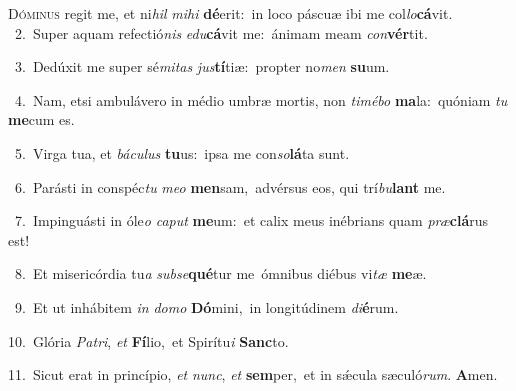 \lettrine{\initial\textcolor{\initialcolor}{D}}{óminus} regit me, et ni\textit{hil} \textit{mi}\-\textit{hi} \textbf{dé}\-erit:~\star in loco páscuæ ibi me col\-\textit{lo}\-\textbf{cá}vit.\\
{\numbfont\textcolor{\numbcolor}{~2.}}~Super aquam refectió\textit{nis} \textit{e}\-\textit{du}\textbf{cá}vit me:~\star ánimam meam \textit{con}\-\textbf{vér}tit.\par
{\numbfont\textcolor{\numbcolor}{~3.}}~Dedúxit me super sé\-\textit{mi}\-\textit{tas} \textit{jus}\-\textbf{tí}tiæ:~\star propter no\textit{men} \textbf{su}\-um.\par
{\numbfont\textcolor{\numbcolor}{~4.}}~Nam, etsi ambulávero in médio umbræ mortis, non \textit{ti}\-\textit{mé}\textit{bo} \textbf{ma}\-la:~\star quóniam \textit{tu} \textbf{me}\-cum es.\par
{\numbfont\textcolor{\numbcolor}{~5.}}~Virga tua, et \textit{bá}\-\textit{cu}\textit{lus} \textbf{tu}\-us:~\star ipsa me con\-\textit{so}\-\textbf{lá}ta sunt.\par
{\numbfont\textcolor{\numbcolor}{~6.}}~Parásti in conspéc\textit{tu} \textit{me}\-\textit{o} \textbf{men}\-sam,~\star advérsus eos, qui trí\-\textit{bu}\-\textbf{lant} me.\par
{\numbfont\textcolor{\numbcolor}{~7.}}~Impinguásti in óle\textit{o} \textit{ca}\-\textit{put} \textbf{me}\-um:~\star et calix meus inébrians quam \textit{præ}\-\textbf{clá}rus est!\par
{\numbfont\textcolor{\numbcolor}{~8.}}~Et misericórdia tu\textit{a} \textit{sub}\-\textit{se}\textbf{qué}tur me~\star ómnibus diébus vi\textit{tæ} \textbf{me}\-æ.\par
{\numbfont\textcolor{\numbcolor}{~9.}}~Et ut inhábitem \textit{in} \textit{do}\-\textit{mo} \textbf{Dó}\-mini,~\star in longitúdinem \textit{di}\-\textbf{é}rum.\par
{\numbfont\textcolor{\numbcolor}{10.}}~Glória \textit{Pa}\-\textit{tri}, \textit{et} \textbf{Fí}\-lio,~\star et Spirítu\textit{i} \textbf{Sanc}\-to.\par
{\numbfont\textcolor{\numbcolor}{11.}}~Sicut erat in princípio, \textit{et} \textit{nunc}\-, \textit{et} \textbf{sem}\-per,~\star et in sǽcula sæculó\-\textit{rum}\-. \textbf{A}\-men.\par
